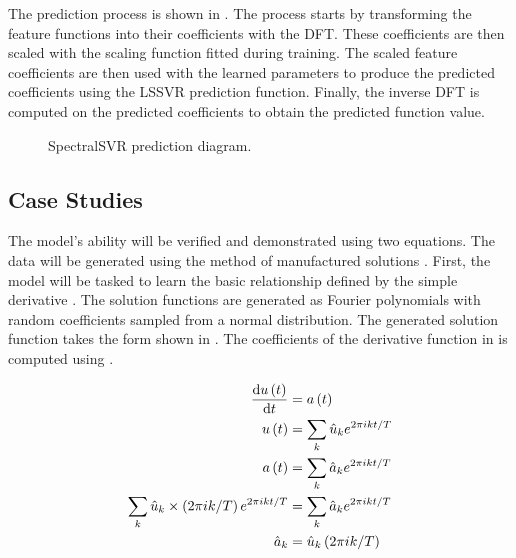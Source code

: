 \documentclass[preprint,12pt,times,authoryear]{elsarticle}
\begin{document}
The prediction process is shown in . The process starts by transforming the feature functions into their coefficients with the DFT\@. These coefficients are then scaled with the scaling function fitted during training. The scaled feature coefficients are then used with the learned parameters to produce the predicted coefficients using the LSSVR prediction function. Finally, the inverse DFT is computed on the predicted coefficients to obtain the predicted function value.
\begin{figure}[hbp]
  \centering
  \caption{SpectralSVR prediction diagram.}\label{fig:spectralsvr_prediction}
\end{figure}


\subsection{Case Studies}
The model's ability will be verified and demonstrated using two equations. The data will be generated using the method of manufactured solutions \citep{roacheCodeVerificationMethod2002,salariCodeVerificationMethod2000,vedovotoApplicationMethodManufactured2011}. First, the model will be tasked to learn the basic relationship defined by the simple derivative . The solution functions are generated as Fourier polynomials with random coefficients sampled from a normal distribution. The generated solution function takes the form shown in . The coefficients of the derivative function in  is computed using .

\begin{align}
  \dv{u\left( t \right)}{t}                                        & = a\left(t\right) \label{eq:fourier_series_derivative}                                                            \\
  u\left( t \right)                                                & = \sum_{k} \hat{u}_k e^{2\pi ikt/T} \label{eq:fourier_speed}                                                      \\
  a\left( t \right)                                                & = \sum_{k} \hat{a}_k e^{2\pi ikt/T} \label{eq:fourier_acceleration}                                               \\
  \sum_{k} \hat{u}_k\times \left( 2\pi ik/T \right) e^{2\pi ikt/T} & = \sum_{k} \hat{a}_k e^{2\pi ikt/T} \label{eq:example_spectral_method_fourier_substituted}                        \\
  \hat{a}_k                                                        & = \hat{u}_k\left(2\pi ik/T \right)                                                    \label{eq:derivative_coeff}
\end{align}
\end{document}
